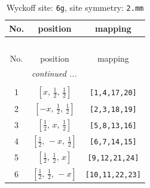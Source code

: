 \documentclass[fleqn,8pt]{jsarticle}
\begin{document}
\renewcommand{\arraystretch}{1.2}
\begin{longtable}{ccc}
\caption{Wyckoff site: {\tt 6g}, site symmetry: {\tt 2.mm}}
 \\
 \hline \hline
No. & position & mapping \\ \hline \endfirsthead

\multicolumn{2}{l}{\tablename\ \thetable{}} \\
 \hline \hline
No. & position & mapping \\ \hline \endhead

 \hline \hline
\multicolumn{2}{r}{\footnotesize\it continued ...} \\ \endfoot

 \hline \hline
\multicolumn{2}{r}{} \\ \endlastfoot

1 & $\left[ x,\, \frac{1}{2},\, \frac{1}{2} \right]$ & {\tt [1,4,17,20]} \\ \hline
2 & $\left[ - x,\, \frac{1}{2},\, \frac{1}{2} \right]$ & {\tt [2,3,18,19]} \\ \hline
3 & $\left[ \frac{1}{2},\, x,\, \frac{1}{2} \right]$ & {\tt [5,8,13,16]} \\ \hline
4 & $\left[ \frac{1}{2},\, - x,\, \frac{1}{2} \right]$ & {\tt [6,7,14,15]} \\ \hline
5 & $\left[ \frac{1}{2},\, \frac{1}{2},\, x \right]$ & {\tt [9,12,21,24]} \\ \hline
6 & $\left[ \frac{1}{2},\, \frac{1}{2},\, - x \right]$ & {\tt [10,11,22,23]} \\
\end{longtable}
\renewcommand{\arraystretch}{1.2}
\end{document}
